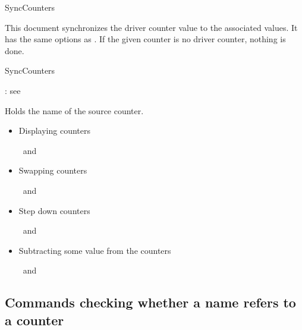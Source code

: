 \documentclass[12pt,a4paper,oneside]{article}
\newcounter{foobar}
\begin{document}
\begin{docCommand}{SyncCounters}{}

This document synchronizes the driver counter value to the associated values. It has the same options as . If the given counter is no driver counter, nothing is done. 

\begin{docCommandArgs}{SyncCounters}%


\begin{codeoptionsenum}
  \item {}: see 

  \item {} 
    Holds the name of the source counter.
  \end{codeoptionsenum}
\end{docCommandArgs}

\end{docCommand}%

\begin{dispExample}%

\begin{itemize}
\item Displaying counters

  \thefoocntr\ and \thefoobarcntr
\item Swapping counters


  \thefoocntr\ and \thefoobarcntr

\item Step down counters


  \thefoocntr\ and \thefoobarcntr

\item Subtracting some value from the counters

  \thefoocntr\ and \thefoobarcntr
\end{itemize}
\end{dispExample}


\subsection[\protect\cs{IfIsDocumentCounter}-Queries]{Commands checking whether a name refers to a counter}
\end{document}
